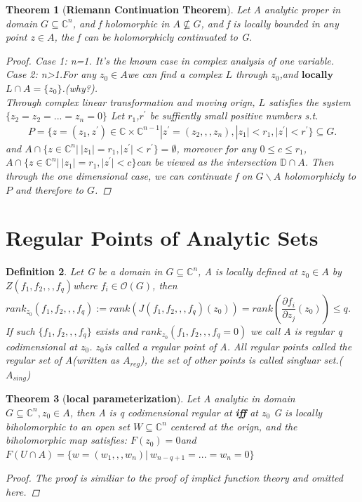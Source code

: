 \documentclass[14pt,reqno]{amsart}
\newtheorem{thm}{Theorem}[section]
\newtheorem{defi}[thm]{Definition}
\numberwithin{equation}{section}
\begin{document}
\begin{thm}	[\textbf{Riemann Continuation Theorem}]
	Let A analytic proper in domain $G\subseteq \mathbb{C}^{n}$, and f holomorphic in $A\nsubseteq G$, and f is locally bounded in any point $z\in A$, the f can be holomorphicly continuated to G.
	\begin{proof}
		Case 1: n=1. It's the known case in complex analysis of one variable.
		\\Case 2: n>1.For any $z_{0}\in A$we can find a complex $L$ through $z_{0}$,and $\textbf{locally}$ $L \cap A=\{z_{0}\}$.(why?).
		\\Through complex linear transformation and moving orign, $L$ satisfies the system$\{z_{2}=z_{2}=...=z_{n}=0\}$
		Let $r_{1}$,$r^{'}$ be suffiently small positive numbers s.t.
		\begin{equation*}
			\begin{aligned}
				P=\{z=(z_{1},z^{'})\in\mathbb{C}\times\mathbb{C}^{n-1}|z^{'}=(z_{2},,,z_{n}), |z_{1}|<r_{1}, |z^{'}|<r^{'}\} \subseteq G.
			\end{aligned}
		\end{equation*}
		and $A\cap\{z\in \mathbb{C}^{n}|\ |z_{1}|=r_{1}, |z^{'}|<r^{'}\}=\emptyset$,
		moreover for any $0\leq c\le r_{1}$, $A\cap\{z\in \mathbb{C}^{n}|\ |z_{1}|=r_{1}, |z^{'}|<c\}$can be viewed as the intersection $\mathbb{D}\cap A$. Then through the one dimensional case, we can continuate f on  $G\backslash A$  holomorphicly to $P$ and therefore to $G$. 
	\end{proof}
\end{thm}
{\centering\section{Regular Points of Analytic Sets}}
\begin{defi}\rm
	Let G be a domain in $G\subseteq \mathbb{C}^{n}$, A is locally defined at $z_{0}\in A$ by $Z(f_{1},f_{2},,,f_{q})$where $f_{i}\in \mathcal{O}(G)$, then $rank_{z_{0}}(f_{1},f_{2},,,f_{q}):=rank(J(f_{1},f_{2},,,f_{q})(z_{0}))=rank(\dfrac{\partial f_{i}}{\partial z_{j}}(z_{0}))\leq q$.
	If such $\{f_{1},f_{2},,,f_{q}\}$ exists and $rank_{z_{0}}(f_{1},f_{2},,,f_{q}=0)$ we call A is regular q codimensional at $z_{0}$. $z_{0}$is called a regular point of A. All regular points called the regular set of A(written as $A_{reg}$), the set of other points is called singluar set.($A_{sing}$) 
\end{defi}
\begin{thm}	[\textbf{local parameterization}]
	Let A analytic in domain$G\subseteq \mathbb{C}^{n},z_{0}\in A$, then A is q codimensional regular at \textbf{iff} at $z_{0}$ G is locally biholomorphic to an open set $W\subseteq\mathbb{C}^{n}$ centered at the orign, and the biholomorphic map satisfies:
	$F(z_{0})=0$and $F(U\cap A)=\{w=(w_{1},,,w_{n})|\ w_{n-q+1}=...=w_{n}=0\}$
	\begin{proof}
		The proof is similiar to the proof of implict function theory and omitted here.
 	\end{proof}
\end{thm}
\end{document}
